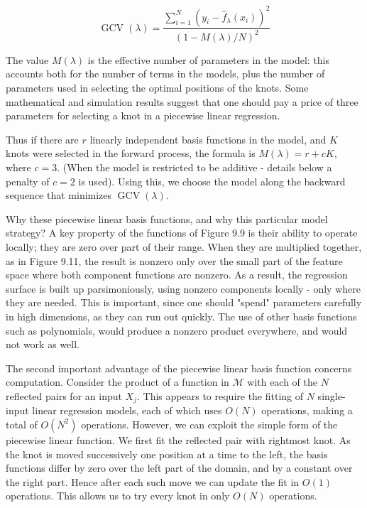 \documentclass[10pt]{article}
\begin{document}
\begin{equation*}
\operatorname{GCV}(\lambda)=\frac{\sum_{i=1}^{N}\left(y_{i}-\hat{f}_{\lambda}\left(x_{i}\right)\right)^{2}}{(1-M(\lambda) / N)^{2}} \tag{9.20}
\end{equation*}


The value $M(\lambda)$ is the effective number of parameters in the model: this accounts both for the number of terms in the models, plus the number of parameters used in selecting the optimal positions of the knots. Some mathematical and simulation results suggest that one should pay a price of three parameters for selecting a knot in a piecewise linear regression.

Thus if there are $r$ linearly independent basis functions in the model, and $K$ knots were selected in the forward process, the formula is $M(\lambda)=r+c K$, where $c=3$. (When the model is restricted to be additive - details below a penalty of $c=2$ is used). Using this, we choose the model along the backward sequence that minimizes $\operatorname{GCV}(\lambda)$.

Why these piecewise linear basis functions, and why this particular model strategy? A key property of the functions of Figure 9.9 is their ability to operate locally; they are zero over part of their range. When they are multiplied together, as in Figure 9.11, the result is nonzero only over the small part of the feature space where both component functions are nonzero. As a result, the regression surface is built up parsimoniously, using nonzero components locally - only where they are needed. This is important, since one should "spend" parameters carefully in high dimensions, as they can run out quickly. The use of other basis functions such as polynomials, would produce a nonzero product everywhere, and would not work as well.

The second important advantage of the piecewise linear basis function concerns computation. Consider the product of a function in $\mathcal{M}$ with each of the $N$ reflected pairs for an input $X_{j}$. This appears to require the fitting of $N$ single-input linear regression models, each of which uses $O(N)$ operations, making a total of $O\left(N^{2}\right)$ operations. However, we can exploit the simple form of the piecewise linear function. We first fit the reflected pair with rightmost knot. As the knot is moved successively one position at a time to the left, the basis functions differ by zero over the left part of the domain, and by a constant over the right part. Hence after each such move we can update the fit in $O(1)$ operations. This allows us to try every knot in only $O(N)$ operations.
\end{document}
